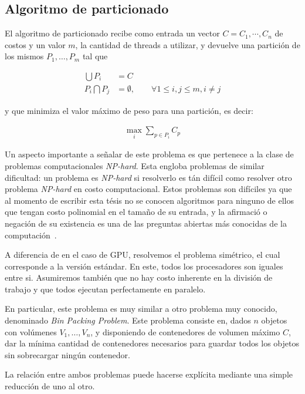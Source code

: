 \subsection{Algoritmo de particionado}

El algoritmo de particionado recibe como entrada un vector $C = {C_1, \cdots, C_n}$
de costos y un valor $m$, la cantidad de threads a utilizar, y devuelve una
partici\'on de los mismos $P_1, \dots, P_m$ tal que

\begin{align}
    \bigcup P_i & = C \\
    P_i \bigcap P_j & = \emptyset, \qquad \forall 1 \leq i,j \leq m, i \neq j
    \label{eq:partition-conditions}
\end{align}

y que minimiza el valor m\'aximo de peso para una partici\'on, es decir:

\begin{align}
    \displaystyle \max_i \sum_{p \in P_i} C_p
\end{align}

Un aspecto importante a se\~nalar de este problema es que pertenece a la clase
de problemas computacionales \textit{NP-hard}. Esta engloba problemas de similar
dificultad: un problema es \textit{NP-hard} si resolverlo es t\'an dif\'icil como
resolver otro problema \textit{NP-hard} en costo computacional. Estos problemas
son dif\'iciles ya que al momento de escribir esta t\'esis no se conocen algoritmos
para ninguno de ellos que tengan costo polinomial en el tama\~no de su entrada, y
la afirmaci\'o o negaci\'on de su existencia es una de las preguntas abiertas
m\'as conocidas de la computaci\'on~\cite{Cormen}.

A diferencia de en el caso de GPU, resolvemos el problema sim\'etrico, el cual
corresponde a la versi\'on est\'andar. En este, todos los procesadores son
iguales entre si. Asumiremos tambi\'en que no hay costo inherente en la
divisi\'on de trabajo y que todos ejecutan perfectamente en paralelo.

En particular, este problema es muy similar a otro problema muy conocido,
denominado \textit{Bin Packing Problem}. Este problema consiste en, dados $n$
objetos con vol\'umenes $V_1, \dots, V_n$, y disponiendo de contenedores de
volumen m\'aximo $C$, dar la m\'inima cantidad de contenedores necesarios para
guardar todos los objetos sin sobrecargar ning\'un contenedor.

La relaci\'on entre ambos problemas puede hacerse expl\'icita mediante una simple
reducci\'on de uno al otro.

